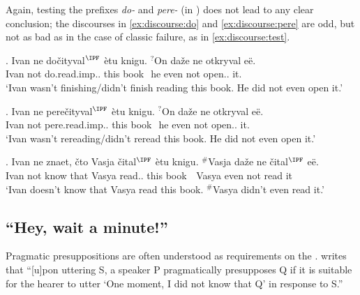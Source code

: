 Again, testing the prefixes \textit{do-} and \textit{pere-} (in ) does not lead to any clear conclusion; the discourses in \ref{ex:discourse:do} and \ref{ex:discourse:pere} are odd, but not as bad as in the case of classic  failure, as in \ref{ex:discourse:test}.

\exg. \label{ex:discourse:do}Ivan ne do\v{c}ityval$^{\IPF}$ \`{e}tu knigu. $^?$On da\v{z}e ne otkryval e\"{e}.\\
Ivan not do.read.imp.. this book \textcolor{white}{$^?$}he even not open.. it.\\
\trans `Ivan wasn't finishing/didn't finish reading this book. He did not even open it.'

\exg. \label{ex:discourse:pere}Ivan ne pere\v{c}ityval$^{\IPF}$ \`{e}tu knigu. $^?$On da\v{z}e ne otkryval e\"{e}.\\
Ivan not pere.read.imp.. this book \textcolor{white}{$^?$}he even not open.. it.\\
\trans `Ivan wasn't rereading/didn't reread this book. He did not even open it.'

\exg. \label{ex:discourse:test}Ivan ne znaet, \v{c}to Vasja \v{c}ital$^{\IPF}$ \`{e}tu knigu. $^\#$Vasja da\v{z}e ne \v{c}ital$^{\IPF}$ e\"{e}.\\
Ivan not know that Vasya read.. this book \textcolor{white}{$^\#$}Vasya even not read it\\
\trans `Ivan doesn't know that Vasya read this book. $^\#$Vasya didn't even read it.'


\subsection{``Hey, wait a minute!''}
Pragmatic presuppositions are often understood as requirements on the  \citep[see e.g.,][]{Karttunen:73, Stalnaker:73, Shanon:76, Heim:83}. \citet[][248]{Shanon:76} writes that ``[u]pon uttering S, a speaker P pragmatically presupposes Q if it is suitable for the hearer to utter `One moment, I did not know that Q' in response to S.''


